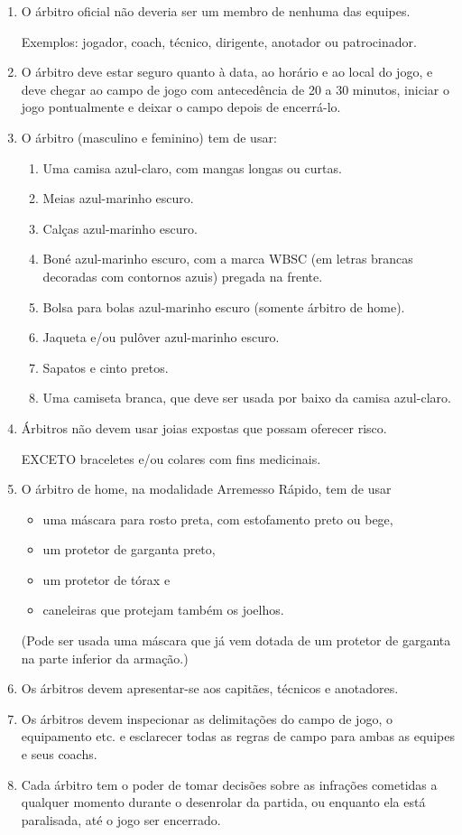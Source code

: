 \begin{enumerate}[label=(\alph*)]
	\item  O árbitro oficial não deveria ser um membro de nenhuma das equipes.

 Exemplos: jogador, \gls{coach}, técnico, dirigente, anotador ou patrocinador.

 	\item O árbitro deve estar seguro quanto à data, ao horário e ao local do jogo, e deve chegar ao campo de jogo com antecedência de 20 a 30 minutos, iniciar o
jogo pontualmente e deixar o campo depois de encerrá-lo.

	\item O árbitro (masculino e feminino) tem de usar:

	\begin{enumerate}[label=(\arabic*)]
		\item Uma camisa azul-claro, com mangas longas ou curtas.
		\item  Meias azul-marinho escuro.
		\item  Calças azul-marinho escuro.
		\item  Boné azul-marinho escuro, com a marca WBSC (em letras brancas decoradas com contornos azuis) pregada na frente.
		\item  Bolsa para bolas azul-marinho escuro (somente árbitro de \gls{home}).
		\item  Jaqueta e/ou pulôver azul-marinho escuro.
		\item  Sapatos e cinto pretos.
		\item  Uma camiseta branca, que deve ser usada por baixo da camisa azul-claro.
	\end{enumerate}

\item Árbitros não devem usar joias expostas que possam oferecer risco.

 EXCETO braceletes e/ou colares com fins medicinais.

\item O árbitro de \gls{home}, na modalidade Arremesso Rápido, tem de usar
\begin{itemize}
	\item uma máscara para rosto preta, com estofamento preto ou bege,
	\item um protetor de garganta preto,
	\item um protetor de tórax e
	\item caneleiras que protejam também os joelhos.
\end{itemize}
	(Pode ser usada uma máscara que já vem dotada de um protetor de garganta na parte inferior da armação.)
\item Os árbitros devem apresentar-se aos capitães, técnicos e anotadores.
\item  Os árbitros devem inspecionar as delimitações do campo de jogo, o equipamento etc. e esclarecer todas as regras de campo para ambas as equipes e seus \glspl{coach}.
\item  Cada árbitro tem o poder de tomar decisões sobre as infrações cometidas a qualquer momento durante o desenrolar da partida, ou enquanto ela está paralisada, até o jogo ser encerrado.


\end{enumerate}
